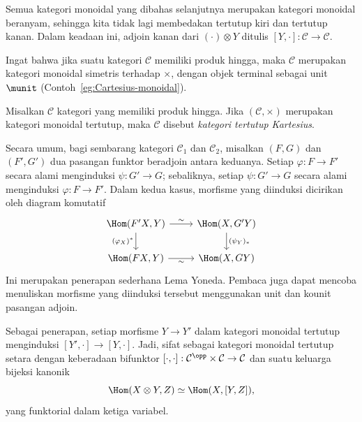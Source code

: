 Semua kategori monoidal yang dibahas selanjutnya merupakan kategori monoidal
beranyam, sehingga kita tidak lagi membedakan tertutup kiri dan tertutup
kanan. Dalam keadaan ini, adjoin kanan dari $(\cdot)\otimes Y$ ditulis
$[Y,\cdot]:\mathcal{C}\to\mathcal{C}$.

Ingat bahwa jika suatu kategori $\mathcal{C}$ memiliki produk hingga, maka
$\mathcal{C}$ merupakan kategori monoidal simetris terhadap $\times$, dengan
objek terminal sebagai unit $\munit$
(Contoh~\ref{eg:Cartesius-monoidal}).

\begin{definition}\label{def:Cartesian-closed}
	Misalkan $\mathcal{C}$ kategori yang memiliki produk hingga. Jika
	$(\mathcal{C},\times)$ merupakan kategori monoidal tertutup, maka
	$\mathcal{C}$ disebut \emph{kategori tertutup Kartesius}.
\end{definition}

Secara umum, bagi sembarang kategori $\mathcal{C}_1$ dan $\mathcal{C}_2$,
misalkan $(F,G)$ dan $(F',G')$ dua pasangan funktor beradjoin antara keduanya.
Setiap $\varphi:F\to F'$ secara alami menginduksi $\psi:G'\to G$; sebaliknya,
setiap $\psi:G'\to G$ secara alami menginduksi $\varphi:F\to F'$. Dalam kedua
kasus, morfisme yang diinduksi dicirikan oleh diagram komutatif
\[\begin{tikzcd}
	\Hom(F' X, Y) \arrow[r, "\sim"] \arrow[d, "{(\varphi_X)^*}"'] & \Hom(X, G'Y) \arrow[d, "{(\psi_Y)_*}"] \\
	\Hom(FX, Y) \arrow[r, "\sim"'] & \Hom(X, GY)
\end{tikzcd}\]
Ini merupakan penerapan sederhana Lema Yoneda. Pembaca juga dapat mencoba
menuliskan morfisme yang diinduksi tersebut menggunakan unit dan kounit pasangan
adjoin.

Sebagai penerapan, setiap morfisme $Y\to Y'$ dalam kategori monoidal tertutup
menginduksi $[Y',\cdot]\to[Y,\cdot]$. Jadi, sifat sebagai kategori monoidal
tertutup setara dengan keberadaan bifunktor
$[\cdot,\cdot]:\mathcal{C}^{\opp}\times\mathcal{C}\to\mathcal{C}$ dan suatu
keluarga bijeksi kanonik
\begin{equation}\label{eqn:closed-monoidal-adj0}
	\Hom(X \otimes Y, Z) \simeq \Hom(X, [Y, Z]),
\end{equation}
yang funktorial dalam ketiga variabel.

